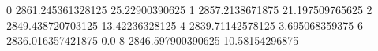 0 2861.245361328125 25.22900390625
1 2857.2138671875 21.197509765625
2 2849.438720703125 13.42236328125
4 2839.71142578125 3.695068359375
6 2836.016357421875 0.0
8 2846.597900390625 10.58154296875
